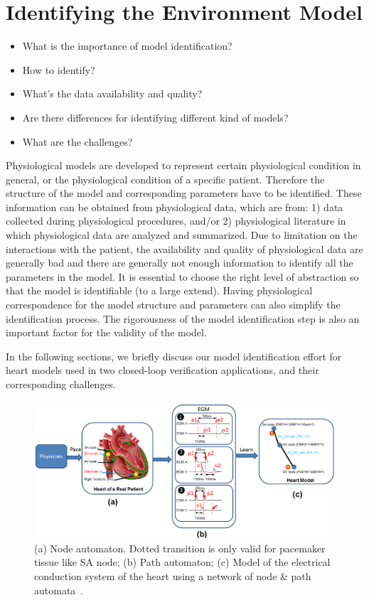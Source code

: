 \chapter{Identifying the Environment Model }
\begin{itemize}
	\item What is the importance of model identification?
    \item How to identify?
    \item What's the data availability and quality?
    \item Are there differences for identifying different kind of models?
    \item What are the challenges?
\end{itemize}
Physiological models are developed to represent certain physiological condition in general, or the physiological condition of a specific patient. Therefore the structure of the model and corresponding parameters have to be identified. These information can be obtained from physiological data, which are from: 1) data collected during physiological procedures, and/or 2) physiological literature in which physiological data are analyzed and summarized. Due to limitation on the interactions with the patient, the availability and quality of physiological data are generally bad and there are generally not enough information to identify all the parameters in the model. It is essential to choose the right level of abstraction so that the model is identifiable (to a large extend). Having physiological correspondence for the model structure and parameters can also simplify the identification process. The rigorousness of the model identification step is also an important factor for the validity of the model. 

In the following sections, we briefly discuss our model identification effort for heart models used in two closed-loop verification applications, and their corresponding challenges. 
\begin{figure}[!t]
\centering
		\includegraphics[width=0.9  \textwidth]{figs/modelID.png}
		
\caption{\small (a) Node automaton. Dotted transition is only valid for pacemaker tissue like SA node; (b) Path automaton; (c) Model of the electrical conduction system of the heart using a network of node \& path automata~\cite{vhm_ecrts10}.}
\label{fig:modelID}
\end{figure} 

